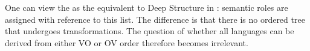 \eal
\label{ex-schlagen-beat}
\ex
{}
\ex 
{}
\zl

\noindent
One can view the \argstl as the equivalent to Deep Structure in \gbt:
semantic roles are assigned with reference to this list. The difference is that there is no ordered tree
that undergoes transformations. The question of whether all languages can be derived from either VO or OV order
therefore becomes irrelevant. 

